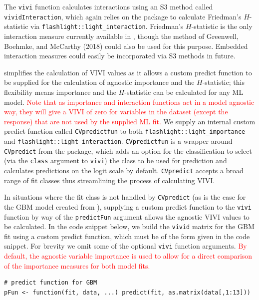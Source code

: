 The \texttt{vivi} function calculates interactions using an S3 method called \texttt{vividInteraction}, which again relies on the  package to calculate Friedman's \(H\)-statistic via
\texttt{flashlight::light\_interaction}. Friedman's \(H\)-statistic is the only interaction measure currently available in , though the method of Greenwell, Boehmke, and McCarthy (2018) could also be used for this purpose. Embedded interaction measures could easily be incorporated via S3 methods in future.

 simplifies the calculation of VIVI values
as it allows a custom predict function to be supplied for the calculation of agnostic importance and the \(H\)-statistic; this flexibility means importance and the \(H\)-statistic can be calculated for any ML model. \textcolor{red}{Note that as  importance and interaction functions act in a model agnostic way, they will give a VIVI of zero for variables in the dataset (except the response) that are not used by the supplied ML fit.}
We supply an internal custom predict function called \texttt{CVpredictfun} to both \texttt{flashlight::light\_importance} and \texttt{flashlight::light\_interaction}. \texttt{CVpredictfun} is a wrapper around \texttt{CVpredict} from the  package, which adds an option for the classification to select (via the \texttt{class} argument to \texttt{vivi}) the class to be used for prediction and calculates predictions on the logit scale by default.
\texttt{CVpredict} accepts a broad range of fit classes thus streamlining the process of calculating VIVI.

In situations where the fit class is not handled by \texttt{CVpredict} (as is the case for the GBM model created from ), supplying a custom predict function to the \texttt{vivi} function by way of the \texttt{predictFun} argument allows the agnostic VIVI values to be calculated.
In the code snippet below, we build the \texttt{vivid} matrix for the GBM fit using a custom predict function, which must be of the form given in the code snippet.
For brevity we omit some of the optional \texttt{vivi} function arguments. \textcolor{red}{By default, the agnostic variable importance is used to allow for a direct comparison of the importance measures for both model fits.}

\begin{verbatim}
# predict function for GBM
pFun <- function(fit, data, ...) predict(fit, as.matrix(data[,1:13]))
\end{verbatim}

